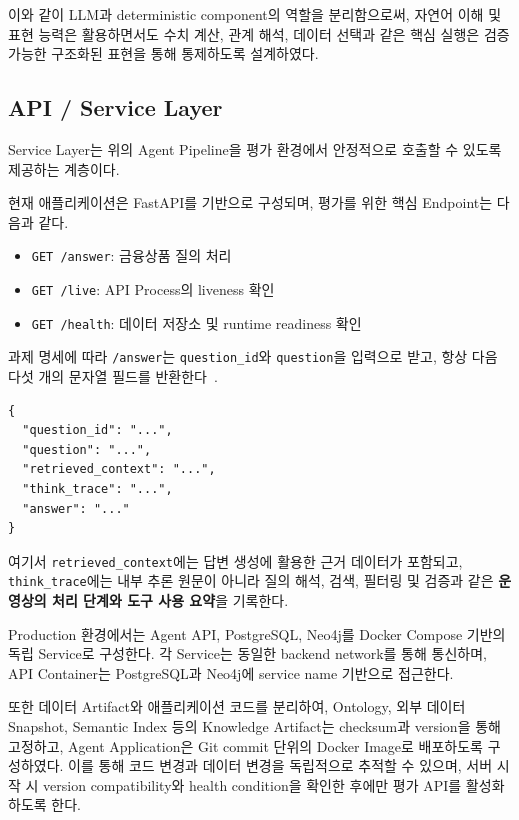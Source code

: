 \documentclass[11pt,a4paper]{article}
\begin{document}
이와 같이 LLM과 deterministic component의 역할을 분리함으로써,
자연어 이해 및 표현 능력은 활용하면서도
수치 계산, 관계 해석, 데이터 선택과 같은 핵심 실행은
검증 가능한 구조화된 표현을 통해 통제하도록 설계하였다.


\subsection{API / Service Layer}

Service Layer는 위의 Agent Pipeline을
평가 환경에서 안정적으로 호출할 수 있도록 제공하는 계층이다.

현재 애플리케이션은 FastAPI를 기반으로 구성되며,
평가를 위한 핵심 Endpoint는 다음과 같다.

\begin{itemize}
    \item \texttt{GET /answer}: 금융상품 질의 처리
    \item \texttt{GET /live}: API Process의 liveness 확인
    \item \texttt{GET /health}: 데이터 저장소 및 runtime readiness 확인
\end{itemize}

과제 명세에 따라 \texttt{/answer}는
\texttt{question\_id}와 \texttt{question}을 입력으로 받고,
항상 다음 다섯 개의 문자열 필드를 반환한다~\cite[11쪽]{mirae-task}.

\begin{verbatim}
{
  "question_id": "...",
  "question": "...",
  "retrieved_context": "...",
  "think_trace": "...",
  "answer": "..."
}
\end{verbatim}

여기서 \texttt{retrieved\_context}에는
답변 생성에 활용한 근거 데이터가 포함되고,
\texttt{think\_trace}에는 내부 추론 원문이 아니라
질의 해석, 검색, 필터링 및 검증과 같은
\textbf{운영상의 처리 단계와 도구 사용 요약}을 기록한다.

Production 환경에서는
Agent API, PostgreSQL, Neo4j를
Docker Compose 기반의 독립 Service로 구성한다.
각 Service는 동일한 backend network를 통해 통신하며,
API Container는 PostgreSQL과 Neo4j에
service name 기반으로 접근한다.

또한 데이터 Artifact와 애플리케이션 코드를 분리하여,
Ontology, 외부 데이터 Snapshot,
Semantic Index 등의 Knowledge Artifact는
checksum과 version을 통해 고정하고,
Agent Application은 Git commit 단위의 Docker Image로 배포하도록 구성하였다.
이를 통해 코드 변경과 데이터 변경을 독립적으로 추적할 수 있으며,
서버 시작 시 version compatibility와 health condition을 확인한 후에만
평가 API를 활성화하도록 한다.
\end{document}
